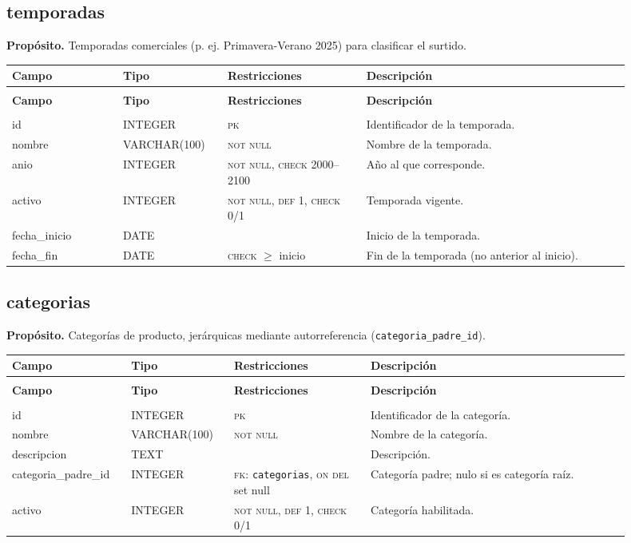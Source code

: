 \documentclass[11pt]{article}
\makeatletter
\newenvironment{campos}{%
  \par\footnotesize
  \setlength{\LTpre}{0.3ex}\setlength{\LTpost}{0.6ex}
  \begin{longtable}{@{}>{\ttfamily}p{0.165\linewidth} >{\ttfamily}p{0.150\linewidth} p{0.205\linewidth} >{\raggedright\arraybackslash}p{0.385\linewidth}@{}}
  \toprule
  \normalfont\bfseries Campo & \normalfont\bfseries Tipo & \normalfont\bfseries Restricciones & \normalfont\bfseries Descripción \\
  \midrule \endfirsthead
  \multicolumn{4}{@{}l}{\footnotesize\itshape \dots\ continuación}\\[0.3ex]
  \toprule
  \normalfont\bfseries Campo & \normalfont\bfseries Tipo & \normalfont\bfseries Restricciones & \normalfont\bfseries Descripción \\
  \midrule \endhead
  \midrule \multicolumn{4}{r@{}}{\footnotesize\itshape continúa en la siguiente página}\\ \endfoot
  \bottomrule \endlastfoot
}{%
  \end{longtable}\par
}
\newcommand{\proposito}[1]{\par\vspace{0.2ex}\noindent\colorbox{brandlight}{\parbox{\dimexpr\linewidth-2\fboxsep}{\small\textbf{Propósito.} #1}}\par\vspace{0.8ex}}
\newcommand{\pk}{\textsc{pk}}
\newcommand{\fk}[1]{\textsc{fk}: \texttt{#1}}
\newcommand{\nn}{\textsc{not null}}
\makeatother
\begin{document}
\subsection{temporadas}
\proposito{Temporadas comerciales (p. ej. Primavera-Verano 2025) para clasificar el surtido.}
\begin{campos}
id            & INTEGER      & \pk{}             & Identificador de la temporada. \\
nombre        & VARCHAR(100) & \nn               & Nombre de la temporada. \\
anio          & INTEGER      & \nn, \textsc{check} 2000--2100 & Año al que corresponde. \\
activo        & INTEGER      & \nn, \textsc{def} 1, \textsc{check} 0/1 & Temporada vigente. \\
fecha\_inicio & DATE         &                   & Inicio de la temporada. \\
fecha\_fin    & DATE         & \textsc{check} $\geq$ inicio & Fin de la temporada (no anterior al inicio). \\
\end{campos}

\subsection{categorias}
\proposito{Categorías de producto, jerárquicas mediante autorreferencia (\texttt{categoria\_padre\_id}).}
\begin{campos}
id                  & INTEGER      & \pk{}        & Identificador de la categoría. \\
nombre              & VARCHAR(100) & \nn          & Nombre de la categoría. \\
descripcion         & TEXT         &              & Descripción. \\
categoria\_padre\_id & INTEGER     & \fk{categorias}, \textsc{on del} set null & Categoría padre; nulo si es categoría raíz. \\
activo              & INTEGER      & \nn, \textsc{def} 1, \textsc{check} 0/1 & Categoría habilitada. \\
\end{campos}
\end{document}
